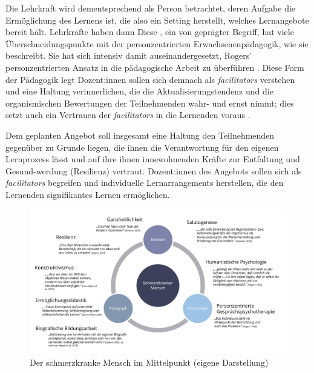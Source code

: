 \documentclass[
  twoside,
  parskip=half-,
]{scrreprt}
\begin{document}
Die Lehrkraft wird dementsprechend als  Person betrachtet, deren Aufgabe die Ermöglichung des Lernens ist, die also ein Setting herstellt, welches Lernangebote bereit hält. Lehrkräfte haben dann   Diese , ein von \citeauthor{arnold} geprägter Begriff, hat viele Überschneidungspunkte mit der personzentrierten Erwachsenenpädagogik, wie \citeauthor{kunze} sie beschreibt. Sie hat sich intensiv damit auseinandergesetzt, Rogers' personzentrierten Ansatz in die pädagogische Arbeit zu überführen \autocite[Kap. 5]{kunze}. Diese Form der Pädagogik legt  Dozent:innen sollen sich demnach als \textit{facilitators} verstehen und eine Haltung verinnerlichen, die die Aktualisierungstendenz und die organismischen Bewertungen der Teilnehmenden wahr- und ernst nimmt; dies setzt auch ein Vertrauen der \textit{facilitators} in die Lernenden voraus \autocite[vgl.][281]{kunze}. 

\begin{praxis}
  Dem geplanten Angebot soll insgesamt eine Haltung den Teilnehmenden gegenüber zu Grunde liegen, die ihnen die Verantwortung für den eigenen Lernprozess lässt und auf ihre ihnen innewohnenden Kräfte zur Entfaltung und Gesund-werdung (Resilienz) vertraut. Dozent:innen des Angebots sollen sich als \textit{facilitators} begreifen und individuelle Lernarrangements herstellen, die den Lernenden signifikantes Lernen ermöglichen. 
\end{praxis} 


\begin{figure}
  \centering
  \includegraphics[width=1.1\textwidth]{Grafiken/Der Schmerzkranke im Mittelpunkt.pdf}
  \caption{Der schmerzkranke Mensch im Mittelpunkt (eigene Darstellung)}
  \label{fig:schmerzmensch}
\end{figure}
\end{document}
